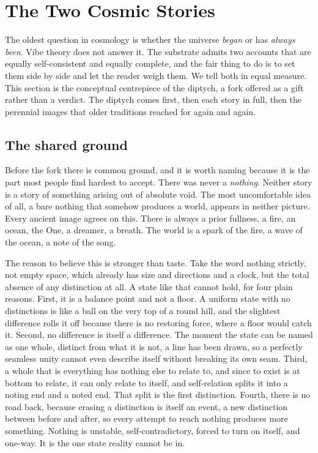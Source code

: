 \section{The Two Cosmic Stories}
\label{app:cosmic-stories}

The oldest question in cosmology is whether the universe \emph{began} or has \emph{always been}. Vibe theory does
not answer it. The substrate admits two accounts that are equally self-consistent and equally complete, and the
fair thing to do is to set them side by side and let the reader weigh them. We tell both in equal measure. This
section is the conceptual centrepiece of the diptych, a fork offered as a gift rather than a verdict. The diptych
comes first, then each story in full, then the perennial images that older traditions reached for again and again.

\subsection{The shared ground}

Before the fork there is common ground, and it is worth naming because it is the part most people find hardest to
accept. There was never a \emph{nothing}. Neither story is a story of something arising out of absolute void. The
most uncomfortable idea of all, a bare nothing that somehow produces a world, appears in neither picture. Every
ancient image agrees on this. There is always a prior fullness, a fire, an ocean, the One, a dreamer, a breath.
The world is a spark of the fire, a wave of the ocean, a note of the song.

The reason to believe this is stronger than taste. Take the word nothing strictly, not empty space, which already
has size and directions and a clock, but the total absence of any distinction at all. A state like that cannot
hold, for four plain reasons. First, it is a balance point and not a floor. A uniform state with no distinctions
is like a ball on the very top of a round hill, and the slightest difference rolls it off because there is no
restoring force, where a floor would catch it. Second, no difference is itself a difference. The moment the state
can be named as one whole, distinct from what it is not, a line has been drawn, so a perfectly seamless unity
cannot even describe itself without breaking its own seam. Third, a whole that is everything has nothing else to
relate to, and since to exist is at bottom to relate, it can only relate to itself, and self-relation splits it
into a noting end and a noted end. That split is the first distinction. Fourth, there is no road back, because
erasing a distinction is itself an event, a new distinction between before and after, so every attempt to reach
nothing produces more something. Nothing is unstable, self-contradictory, forced to turn on itself, and one-way.
It is the one state reality cannot be in.

